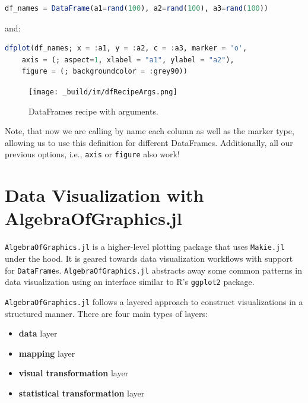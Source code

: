 \documentclass[
  notoc %
]{tufte-book}
\providecommand{\tightlist}{%
  \setlength{\itemsep}{0pt}\setlength{\parskip}{0pt}
}
\newcommand{\passthrough}[1]{#1}
\begin{document}
\begin{lstlisting}[language=Julia]
df_names = DataFrame(a1=rand(100), a2=rand(100), a3=rand(100))
\end{lstlisting}

and:

\begin{lstlisting}[language=Julia]
dfplot(df_names; x = :a1, y = :a2, c = :a3, marker = 'o',
    axis = (; aspect=1, xlabel = "a1", ylabel = "a2"),
    figure = (; backgroundcolor = :grey90))
\end{lstlisting}

\begin{figure}
\hypertarget{fig:dfRecipeArgs}{%
\centering
\texttt{[image: \_build/im/dfRecipeArgs.png]}
\caption{DataFrames recipe with arguments.}\label{fig:dfRecipeArgs}
}
\end{figure}

Note, that now we are calling by name each column as well as the marker
type, allowing us to use this definition for different DataFrames.
Additionally, all our previous options, i.e.,
\passthrough{\lstinline!axis!} or \passthrough{\lstinline!figure!} also
work!

\hypertarget{sec:aog}{%
\chapter{Data Visualization with AlgebraOfGraphics.jl}\label{sec:aog}}

\passthrough{\lstinline!AlgebraOfGraphics.jl!} is a higher-level
plotting package that uses \passthrough{\lstinline!Makie.jl!} under the
hood. It is geared towards data visualization workflows with support for
\passthrough{\lstinline!DataFrame!}s.
\passthrough{\lstinline!AlgebraOfGraphics.jl!} abstracts away some
common patterns in data visualization using an interface similar to R's
\passthrough{\lstinline!ggplot2!} package.

\passthrough{\lstinline!AlgebraOfGraphics.jl!} follows a layered
approach to construct visualizations in a structured manner. There are
four main types of layers:

\begin{itemize}
\tightlist
\item
  \textbf{data} layer
\item
  \textbf{mapping} layer
\item
  \textbf{visual transformation} layer
\item
  \textbf{statistical transformation} layer
\end{itemize}
\end{document}
